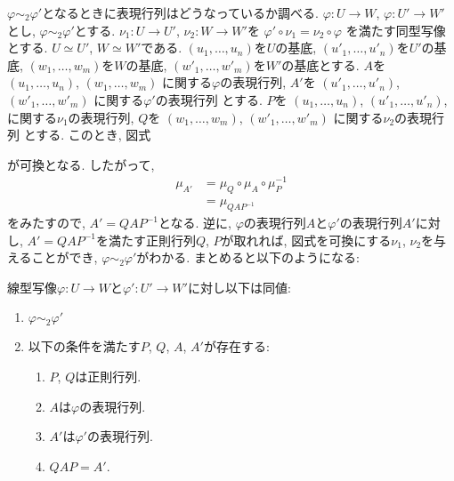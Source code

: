 $\varphi\sim_2\varphi'$となるときに表現行列はどうなっているか調べる.
$\varphi\colon U\to W$,
$\varphi\colon U'\to W'$とし,
$\varphi\sim_2\varphi'$とする.
$\nu_1\colon U\to U'$,
$\nu_2\colon W\to W'$を
$\varphi'\circ\nu_1=\nu_2\circ \varphi$
を満たす同型写像とする.
$U\simeq U'$, $W\simeq W'$である.
$(u_1,\ldots,u_n)$を$U$の基底,
$(u'_1,\ldots,u'_n)$を$U'$の基底,
$(w_1,\ldots,w_m)$を$W$の基底,
$(w'_1,\ldots,w'_m)$を$W'$の基底とする.
$A$を
$(u_1,\ldots,u_n)$,
$(w_1,\ldots,w_m)$
に関する$\varphi$の表現行列,
$A'$を
$(u'_1,\ldots,u'_n)$,
$(w'_1,\ldots,w'_m)$
に関する$\varphi'$の表現行列
とする.
$P$を
$(u_1,\ldots,u_n)$,
$(u'_1,\ldots,u'_n)$,
に関する$\nu_1$の表現行列,
$Q$を
$(w_1,\ldots,w_m)$,
$(w'_1,\ldots,w'_m)$
に関する$\nu_2$の表現行列
とする.
このとき, 図式
\begin{center}
\end{center}
が可換となる.
したがって,
\begin{align*}
  \mu_{A'}&=\mu_{Q}\circ \mu_A \circ \mu_{P}^{-1}\\
  &=\mu_{QAP^{-1}}
\end{align*}
をみたすので, $A'=QAP^{-1}$となる.
逆に, $\varphi$の表現行列$A$と$\varphi'$の表現行列$A'$に対し,
$A'=QAP^{-1}$を満たす正則行列$Q$, $P$が取れれば,
図式を可換にする$\nu_1$, $\nu_2$を与えることができ,
$\varphi\sim_2 \varphi'$がわかる.
まとめると以下のようになる:
\begin{prop}
  線型写像$\varphi\colon U\to W$と$\varphi'\colon U'\to W'$に対し以下は同値:
  \begin{enumerate}
  \item $\varphi\sim_2\varphi'$
  \item 以下の条件を満たす$P$, $Q$, $A$, $A'$が存在する:
    \begin{enumerate}
    \item $P$, $Q$は正則行列.
    \item $A$は$\varphi$の表現行列.
    \item $A'$は$\varphi'$の表現行列.
    \item $QAP=A'$.
    \end{enumerate}
  \end{enumerate}
\end{prop}
